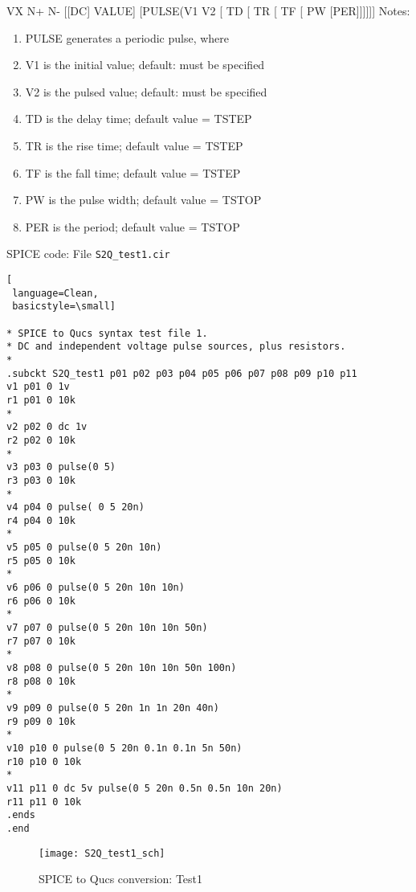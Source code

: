 VX N+ N- [[DC] VALUE] [PULSE(V1 V2 [ TD [ TR [ TF [ PW [PER]]]]]]
\vspace{4mm}
Notes:
\begin{enumerate}
 \item PULSE generates a periodic pulse, where
 \item V1 is the initial value; default: must be specified
 \item V2 is the pulsed value; default: must be specified
 \item TD is the delay time; default value = TSTEP
 \item TR is the rise time; default value = TSTEP
 \item TF is the fall time; default value = TSTEP
 \item PW is the pulse width; default value = TSTOP
 \item PER is the period; default value = TSTOP
\end{enumerate}





SPICE code: File \verb|S2Q_test1.cir|

\begin{lstlisting}[
 language=Clean, 
 basicstyle=\small]

* SPICE to Qucs syntax test file 1.
* DC and independent voltage pulse sources, plus resistors.
*
.subckt S2Q_test1 p01 p02 p03 p04 p05 p06 p07 p08 p09 p10 p11
v1 p01 0 1v
r1 p01 0 10k
*
v2 p02 0 dc 1v
r2 p02 0 10k
*
v3 p03 0 pulse(0 5)
r3 p03 0 10k
*
v4 p04 0 pulse( 0 5 20n)
r4 p04 0 10k
*
v5 p05 0 pulse(0 5 20n 10n)
r5 p05 0 10k
*
v6 p06 0 pulse(0 5 20n 10n 10n)
r6 p06 0 10k
*
v7 p07 0 pulse(0 5 20n 10n 10n 50n)
r7 p07 0 10k
*
v8 p08 0 pulse(0 5 20n 10n 10n 50n 100n)
r8 p08 0 10k
*
v9 p09 0 pulse(0 5 20n 1n 1n 20n 40n)
r9 p09 0 10k
*
v10 p10 0 pulse(0 5 20n 0.1n 0.1n 5n 50n)
r10 p10 0 10k
*
v11 p11 0 dc 5v pulse(0 5 20n 0.5n 0.5n 10n 20n)
r11 p11 0 10k
.ends
.end
\end{lstlisting}


\begin{figure}
  \centering
  \texttt{[image: S2Q\_test1\_sch]}
  \caption{SPICE to Qucs conversion: Test1}
  \label{fig:S2Qtest1_1}
\end{figure} 

